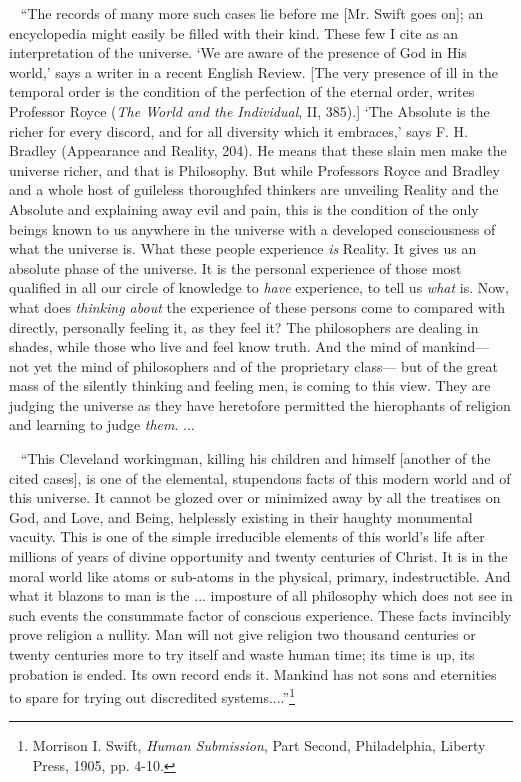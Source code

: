\documentclass[12pt]{article}
\newcounter{wjparagraph}[section]
\newcommand*{\wjparagraph}{\stepcounter{wjparagraph}~\marginpar{\tiny\arabic{wjparagraph} }}
\begin{document}
\wjparagraph
``The records of many more such cases lie before me [Mr. Swift goes on]; an encyclopedia might easily be filled with their kind. These few I cite as an interpretation of the universe. `We are aware of the presence of God in His world,' says a writer in a recent English Review. [The very presence of ill in the temporal order is the condition of the perfection of the eternal order, writes Professor Royce (\emph{The World and the Individual}, II, 385).] `The Absolute is the richer for every discord, and for all diversity which it embraces,' says F. H. Bradley (Appearance and Reality, 204). He means that these slain men make the universe richer, and that is Philosophy. But while Professors Royce and Bradley and a whole host of guileless thoroughfed thinkers are unveiling Reality and the Absolute and explaining away evil and pain, this is the condition of the only beings known to us anywhere in the universe with a developed consciousness of what the universe is. What these people experience \emph{is} Reality. It gives us an absolute phase of the universe. It is the personal experience of those most qualified in all our circle of knowledge to \emph{have} experience, to tell us \emph{what} is. Now, what does \emph{thinking about} the experience of these persons come to compared with directly, personally feeling it, as they feel it? The philosophers are dealing in shades, while those who live and feel know truth. And the mind of mankind--- not yet the mind of philosophers and of the proprietary class--- but of the great mass of the silently thinking and feeling men, is coming to this view. They are judging the universe as they have heretofore permitted the hierophants of religion and learning to judge \emph{them}. ...

\wjparagraph
``This Cleveland workingman, killing his children and himself [another of the cited cases], is one of the elemental, stupendous facts of this modern world and of this universe. It cannot be glozed over or minimized away by all the treatises on God, and Love, and Being, helplessly existing in their haughty monumental vacuity. This is one of the simple irreducible elements of this world's life after millions of years of divine opportunity and twenty centuries of Christ. It is in the moral world like atoms or sub-atoms in the physical, primary, indestructible. And what it blazons to man is the ... imposture of all philosophy which does not see in such events the consummate factor of conscious experience. These facts invincibly prove religion a nullity. Man will not give religion two thousand centuries or twenty centuries more to try itself and waste human time; its time is up, its probation is ended. Its own record ends it. Mankind has not sons and eternities to spare for trying out discredited systems....''\footnote{Morrison I. Swift, \emph{Human Submission}, Part Second, Philadelphia, Liberty Press, 1905, pp. 4-10.}
\end{document}
